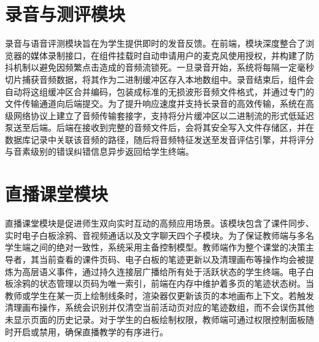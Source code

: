 \section{录音与测评模块}
录音与语音评测模块旨在为学生提供即时的发音反馈。在前端，模块深度整合了浏览器的媒体录制接口，在组件挂载时自动申请用户的麦克风使用授权，并构建了防抖机制以避免因频繁点击造成的音频流锁死。一旦录音开始，系统将每隔一定毫秒切片捕获音频数据，将其作为二进制缓冲区存入本地数组中。录音结束后，组件会自动将这组缓冲区合并编码，包装成标准的无损波形音频文件格式，并通过专门的文件传输通道向后端提交。为了提升响应速度并支持长录音的高效传输，系统在高级网络协议上建立了音频传输套接字，支持将分片缓冲区以二进制流的形式低延迟泵送至后端。后端在接收到完整的音频文件后，会将其安全写入文件存储区，并在数据库记录中关联该音频的路径，随后将音频特征发送至发音评估引擎，并将评分与音素级别的错误纠错信息异步返回给学生终端。

\section{直播课堂模块}
直播课堂模块是促进师生双向实时互动的高频应用场景。该模块包含了课件同步、实时电子白板涂鸦、音视频通话以及文字聊天四个子模块。为了保证教师端与多名学生端之间的绝对一致性，系统采用主备控制模型。教师端作为整个课堂的决策主导者，其当前查看的课件页码、电子白板的笔迹更新以及清理画布等操作均会被提炼为高层语义事件，通过持久连接层广播给所有处于活跃状态的学生终端。电子白板涂鸦的状态管理以页码为唯一索引，前端在内存中维护着多页的笔迹状态树。当教师或学生在某一页上绘制线条时，渲染器仅更新该页的本地画布上下文。若触发清理画布操作，系统会识别并仅清空当前活动页对应的笔迹数组，而不会误伤其他未显示页面的历史记录。对于学生的白板绘制权限，教师端可通过权限控制面板随时开启或禁用，确保直播教学的有序进行。
